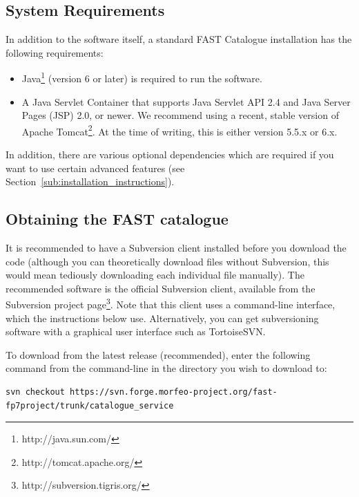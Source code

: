 \documentclass{fast_latex}
\begin{document}
\subsection{System Requirements} %
\label{sub:system_requirements}

In addition to the software itself, a standard FAST Catalogue installation has the following requirements:
\begin{itemize}
  \item Java\footnote{http://java.sun.com/} (version 6 or later) is required to run the software.
  \item A Java Servlet Container that supports Java Servlet API 2.4 and Java Server Pages (JSP) 2.0, or newer. We recommend using a recent, stable version of Apache Tomcat\footnote{http://tomcat.apache.org/}. At the time of writing, this is either version 5.5.x or 6.x.
\end{itemize}

In addition, there are various optional dependencies which are required if you want to use certain advanced features (see Section~\ref{sub:installation_instructions}).


\subsection{Obtaining the FAST catalogue} %
\label{sub:obtaining_the_fast_catalogue}

It is recommended to have a Subversion client installed before you download the code (although you can theoretically download files without Subversion, this would mean tediously downloading each individual file manually). The recommended software is the official Subversion client, available from the Subversion project page\footnote{http://subversion.tigris.org/}. Note that this client uses a command-line interface, which the instructions below use. Alternatively, you can get subversioning software with a graphical user interface such as TortoiseSVN.

To download from the latest release (recommended), enter the following command from the command-line in the directory you wish to download to:
\begin{verbatim}
svn checkout https://svn.forge.morfeo-project.org/fast-fp7project/trunk/catalogue_service
\end{verbatim}

\end{document}
